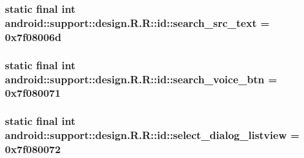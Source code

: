 \hypertarget{classandroid_1_1support_1_1design_1_1_r_1_1id_005e6c5a699ad5a546fcc3a429efbcbb}{
\subsubsection[{search\_\-src\_\-text}]{\setlength{\rightskip}{0pt plus 5cm}static final int android::support::design.R.R::id::search\_\-src\_\-text = 0x7f08006d}}
\label{classandroid_1_1support_1_1design_1_1_r_1_1id_005e6c5a699ad5a546fcc3a429efbcbb}


\hypertarget{classandroid_1_1support_1_1design_1_1_r_1_1id_510abe62e623a04acdb74ff8e5d1173c}{
\subsubsection[{search\_\-voice\_\-btn}]{\setlength{\rightskip}{0pt plus 5cm}static final int android::support::design.R.R::id::search\_\-voice\_\-btn = 0x7f080071}}
\label{classandroid_1_1support_1_1design_1_1_r_1_1id_510abe62e623a04acdb74ff8e5d1173c}


\hypertarget{classandroid_1_1support_1_1design_1_1_r_1_1id_c66e879324e72b4dea5dcb1a328ca373}{
\subsubsection[{select\_\-dialog\_\-listview}]{\setlength{\rightskip}{0pt plus 5cm}static final int android::support::design.R.R::id::select\_\-dialog\_\-listview = 0x7f080072}}
\label{classandroid_1_1support_1_1design_1_1_r_1_1id_c66e879324e72b4dea5dcb1a328ca373}


